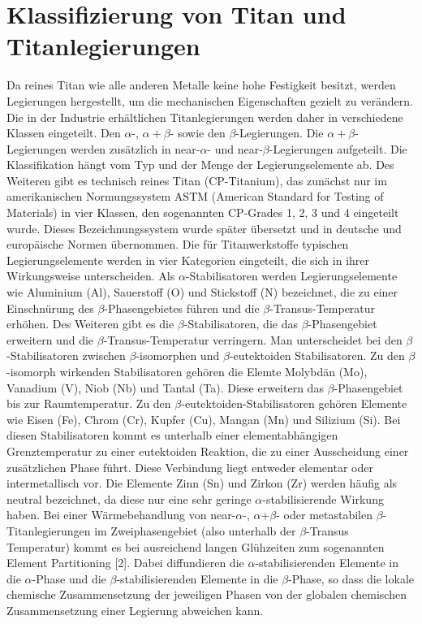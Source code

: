 \section{Klassifizierung von Titan und Titanlegierungen}

Da reines Titan wie alle anderen Metalle keine hohe Festigkeit besitzt, werden Legierungen hergestellt, um die mechanischen Eigenschaften gezielt zu verändern. Die in der Industrie erhältlichen Titanlegierungen werden daher in verschiedene Klassen eingeteilt. Den $\alpha$-, $\alpha+\beta$- sowie den $\beta$-Legierungen. Die $\alpha+\beta$-Legierungen werden zusätzlich in near-$\alpha$- und near-$\beta$-Legierungen aufgeteilt. Die Klassifikation hängt vom Typ und der Menge der Legierungselemente ab. Des Weiteren gibt es technisch reines Titan (CP-Titanium), das zunächst nur im amerikanischen Normungssystem ASTM (American Standard for Testing of Materials) in vier Klassen, den sogenannten CP-Grades 1, 2, 3 und 4 eingeteilt wurde. Dieses Bezeichnungssystem wurde später übersetzt und in deutsche und europäische Normen übernommen.
Die für Titanwerkstoffe typischen Legierungselemente werden in vier Kategorien eingeteilt, die sich in ihrer Wirkungsweise unterscheiden. 
Als $\alpha$-Stabilisatoren werden Legierungselemente wie Aluminium (Al), Sauerstoff (O) und Stickstoff (N) bezeichnet, die zu einer Einschnürung des $\beta$-Phasengebietes führen und die $\beta$-Transus-Temperatur erhöhen.
Des Weiteren gibt es die $\beta$-Stabilisatoren, die das $\beta$-Phasengebiet erweitern und die $\beta$-Transus-Temperatur verringern. Man unterscheidet bei den $\beta$-Stabilisatoren zwischen $\beta$-isomorphen und $\beta$-eutektoiden Stabilisatoren. Zu den $\beta$-isomorph wirkenden Stabilisatoren gehören die Elemte Molybdän (Mo), Vanadium (V), Niob (Nb) und Tantal (Ta). Diese erweitern das $\beta$-Phasengebiet bis zur Raumtemperatur. 
Zu den $\beta$-eutektoiden-Stabilisatoren gehören Elemente wie Eisen (Fe), Chrom (Cr), Kupfer (Cu), Mangan (Mn) und Silizium (Si). Bei diesen Stabilisatoren kommt es unterhalb einer elementabhängigen Grenztemperatur zu einer eutektoiden Reaktion, die zu einer Ausscheidung einer zusätzlichen Phase führt. Diese Verbindung liegt entweder elementar oder intermetallisch vor.
Die Elemente  Zinn (Sn) und Zirkon (Zr) werden häufig als neutral bezeichnet, da diese nur eine sehr geringe $\alpha$-stabilisierende Wirkung haben.
Bei einer Wärmebehandlung von near-$\alpha$-, $\alpha$+$\beta$- oder metastabilen $\beta$-Titanlegierungen im Zweiphasengebiet (also unterhalb der $\beta$-Transus Temperatur) kommt es bei ausreichend langen Glühzeiten zum sogenannten Element Partitioning [2]. Dabei diffundieren die $\alpha$-stabilisierenden Elemente in die $\alpha$-Phase und die $\beta$-stabilisierenden Elemente in die $\beta$-Phase, so dass die lokale chemische Zusammensetzung der jeweiligen Phasen von der globalen chemischen Zusammensetzung einer Legierung abweichen kann.


